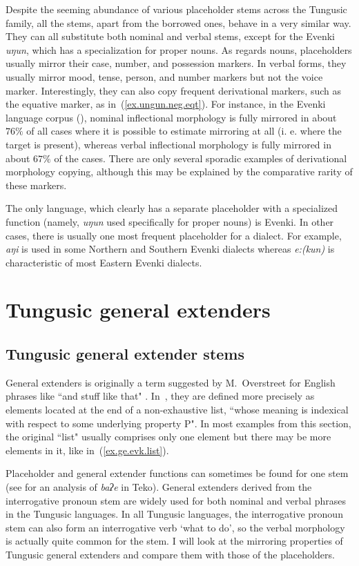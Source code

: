 \documentclass[output=paper,colorlinks,citecolor=brown
\ChapterDOI{10.5281/zenodo.15697577}
]{langscibook}
\begin{document}
Despite the seeming abundance of various placeholder stems across the Tungusic family, all the stems, apart from the borrowed ones, behave in a very similar way. They can all substitute both nominal and verbal stems, except for the Evenki \textit{uŋun}, which has a specialization for proper nouns. As regards nouns, placeholders usually mirror their case, number, and possession markers. In verbal forms, they usually mirror mood, tense, person, and number markers but not the voice marker. Interestingly, they can also copy frequent derivational markers, such as the equative marker, as in~(\ref{ex.ungun.neg.eqt}). For instance, in the Evenki language corpus (\cite{EvenkiCorpusSiberianLang}), nominal inflectional morphology is fully mirrored in about $76\%$ of all cases where it is possible to estimate mirroring at all (i. e. where the target is present), whereas verbal inflectional morphology is fully mirrored in about $67\%$ of the cases. There are only several sporadic examples of derivational morphology copying, although this may be explained by the comparative rarity of these markers.

The only language, which clearly has a separate placeholder with a specialized function (namely, \textit{uŋun} used specifically for proper nouns) is Evenki. In other cases, there is usually one most frequent placeholder for a dialect. For example, \textit{aŋi} is used in some Northern and Southern Evenki dialects whereas \textit{e:(kun)} is characteristic of most Eastern Evenki dialects.

\section{Tungusic general extenders}
\subsection{Tungusic general extender stems}

General extenders is originally a term suggested by M.~Overstreet for English phrases like ``and stuff like that" \citep{overstreet1999whales}. In~\citet{mauri2018linguistic}, they are defined more precisely as elements located at the
end of a non-exhaustive list, ``whose meaning is indexical with respect to some underlying property P". In most examples from this section, the original ``list" usually comprises only one element but there may be more elements in it, like in~(\ref{ex.ge.evk.list}).

Placeholder and general extender functions can sometimes be found for one stem (see \citealt{chapters/rose} for an analysis of \textit{baʔe} in Teko). General extenders derived from the interrogative pronoun stem are widely used for both nominal and verbal phrases in the Tungusic languages. In all Tungusic languages, the interrogative pronoun stem can also form an interrogative verb `what to do', so the verbal morphology is actually quite common for the stem. I will look at the mirroring properties of Tungusic general extenders and compare them with those of the placeholders.
\end{document}
